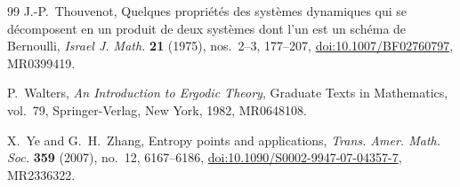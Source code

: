 \documentclass[12pt,letterpaper,reqno]{amsart}
\theoremstyle{definition}
\theoremstyle{remark}
\numberwithin{equation}{section}
\begin{document}
\begin{sloppypar}
\begin{thebibliography}{99}
			J.-P.~Thouvenot,
			Quelques propri\'et\'es des syst\`emes dynamiques qui se d\'ecomposent en
			un produit de deux syst\`emes dont l'un est un sch\'ema de Bernoulli,
			\emph{Israel J. Math.} \textbf{21} (1975), nos.~2--3, 177--207,
			\href{https://doi.org/10.1007/BF02760797}
			{doi:10.1007/BF02760797},
			MR0399419.
			
			P.~Walters,
			\emph{An Introduction to Ergodic Theory},
			Graduate Texts in Mathematics, vol.~79,
			Springer-Verlag, New York, 1982,
			MR0648108.
			
			X.~Ye and G.~H.~Zhang,
			Entropy points and applications,
			\emph{Trans. Amer. Math. Soc.} \textbf{359} (2007), no.~12, 6167--6186,
			\href{https://doi.org/10.1090/S0002-9947-07-04357-7}
			{doi:10.1090/S0002-9947-07-04357-7},
			MR2336322.
			
		\end{thebibliography}
	\end{sloppypar}
	
\end{document}
